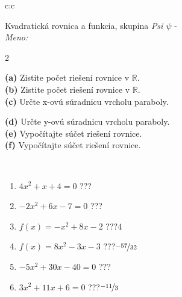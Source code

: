 \documentclass[10pt]{report}
\begin{document}
\begin{tabular}{c:c}
\begin{minipage}[c][104.5mm][t]{0.5\linewidth}
\begin{center}
\vspace{7mm}
{\huge {\LARGE Kvadratická rovnica a funkcia}, skupina \textit{Psi $\psi$} -}\\[5mm]
\textit{Meno:}\phantom{xxxxxxxxxxxxxxxxxxxxxxxxxxxxxxxxxxxxxxxxxxxxxxxxxxxxxxxxxxxxxxxxx}\\[5mm]
\begin{minipage}{0.95\linewidth}
\begin{center}
{\small \begin{multicols}{2} \raggedright
\textbf{(a)} Zistite počet riešení rovnice v \(\mathbb{R}\). \\[1mm]
\textbf{(b)} Zistite počet riešení rovnice v \(\mathbb{R}\). \\[1mm]
\textbf{(c)} Určte x-ovú súradnicu vrcholu paraboly. \par \columnbreak
\textbf{(d)} Určte y-ovú súradnicu vrcholu paraboly. \\[1mm]
\textbf{(e)} Vypočítajte súčet riešení rovnice. \\[1mm]
\textbf{(f)} Vypočítajte súčet riešení rovnice.
\end{multicols}
}
\end{center}
\end{minipage}
\\[4mm]
\begin{minipage}{0.79\linewidth}
\begin{center}
\begin{varwidth}{\linewidth}
\begin{enumerate}
\Large
\item $4x^2+x+4=0$\quad \dotfill\; ???\;\dotfill {}
\item $-2x^2+6x-7=0$\quad \dotfill\; ???\;\dotfill {}
\item $f(x)=-x^2+8x-2$\quad \dotfill\; ???\;\dotfill \quad $4$
\item $f(x)=8x^2-3x-3$\quad \dotfill\; ???\;\dotfill \quad $\nicefrac{-57}{32}$
\item $-5x^2+30x-40=0$\quad \dotfill\; ???\;\dotfill {}
\item $3x^2+11x+6=0$\quad \dotfill\; ???\;\dotfill \quad $\nicefrac{-11}{3}$
\end{enumerate}
\end{varwidth}
\end{center}
\end{minipage}

\end{center}
\end{minipage}
\end{tabular}
\end{document}
